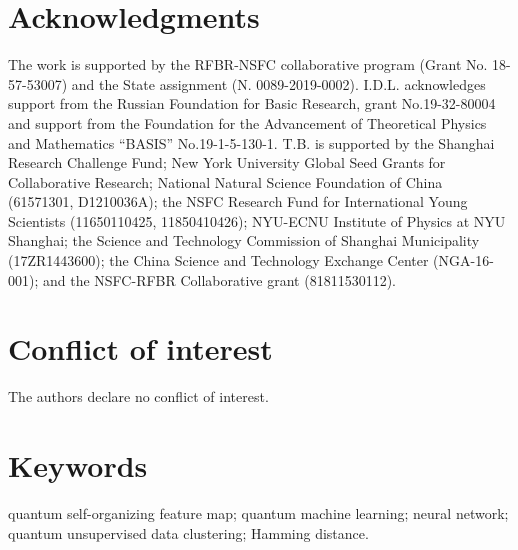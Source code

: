 \documentclass[pra,showkeys,twocolumn,showpacs]{revtex4-1}
\begin{document}
\section*{Acknowledgments}
The work is supported by the RFBR-NSFC collaborative program (Grant No. 18-57-53007) and the State assignment (N. 0089-2019-0002). I.D.L. acknowledges support from the Russian Foundation for Basic Research, grant No.19-32-80004 and support from the Foundation for the Advancement of Theoretical Physics and Mathematics “BASIS” No.19-1-5-130-1. T.B. is supported by the Shanghai Research Challenge Fund; New York University Global Seed Grants for Collaborative Research; National Natural Science Foundation of China (61571301, D1210036A); the NSFC Research Fund for International Young Scientists (11650110425, 11850410426); NYU-ECNU Institute of Physics at NYU Shanghai; the Science and Technology Commission of Shanghai Municipality (17ZR1443600); the China Science and Technology Exchange Center (NGA-16-001); and the NSFC-RFBR Collaborative grant (81811530112).











\section*{Conflict of interest}

The authors declare no conflict of interest.


\section*{Keywords}
quantum self-organizing feature map; quantum machine learning; neural network; quantum unsupervised data clustering; Hamming distance.




\end{document}
